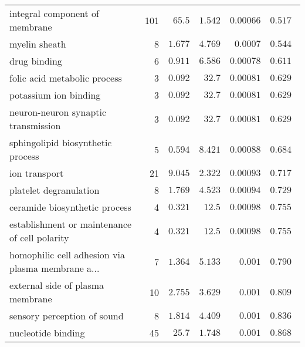\begin{longtable}{|l|r|r|r|r|r|}
                    integral component of membrane &                     101 &                $  65.5$ &   $ 1.542$ &            $0.00066$ &                     $ 0.517~~$ \\
                                     myelin sheath &                       8 &                $ 1.677$ &   $ 4.769$ &             $0.0007$ &                     $ 0.544~~$ \\
                                      drug binding &                       6 &                $ 0.911$ &   $ 6.586$ &            $0.00078$ &                     $ 0.611~~$ \\
                      folic acid metabolic process &                       3 &                $ 0.092$ &   $  32.7$ &            $0.00081$ &                     $ 0.629~~$ \\
                             potassium ion binding &                       3 &                $ 0.092$ &   $  32.7$ &            $0.00081$ &                     $ 0.629~~$ \\
               neuron-neuron synaptic transmission &                       3 &                $ 0.092$ &   $  32.7$ &            $0.00081$ &                     $ 0.629~~$ \\
                 sphingolipid biosynthetic process &                       5 &                $ 0.594$ &   $ 8.421$ &            $0.00088$ &                     $ 0.684~~$ \\
                                     ion transport &                      21 &                $ 9.045$ &   $ 2.322$ &            $0.00093$ &                     $ 0.717~~$ \\
                            platelet degranulation &                       8 &                $ 1.769$ &   $ 4.523$ &            $0.00094$ &                     $ 0.729~~$ \\
                     ceramide biosynthetic process &                       4 &                $ 0.321$ &   $  12.5$ &            $0.00098$ &                     $ 0.755~~$ \\
     establishment or maintenance of cell polarity &                       4 &                $ 0.321$ &   $  12.5$ &            $0.00098$ &                     $ 0.755~~$ \\
 homophilic cell adhesion via plasma membrane a... &                       7 &                $ 1.364$ &   $ 5.133$ &             $ 0.001$ &                     $ 0.790~~$ \\
                  external side of plasma membrane &                      10 &                $ 2.755$ &   $ 3.629$ &             $ 0.001$ &                     $ 0.809~~$ \\
                       sensory perception of sound &                       8 &                $ 1.814$ &   $ 4.409$ &             $ 0.001$ &                     $ 0.836~~$ \\
                                nucleotide binding &                      45 &                $  25.7$ &   $ 1.748$ &             $ 0.001$ &                     $ 0.868~~$ \\
\end{longtable}
